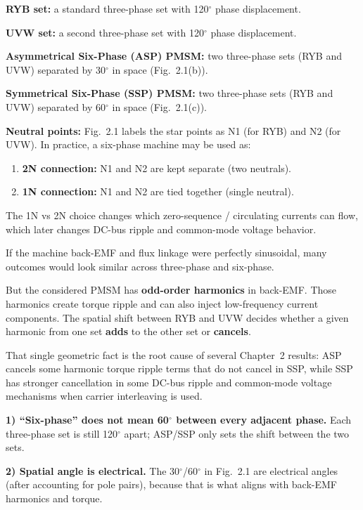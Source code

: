 \documentclass[12pt, a4paper]{article}
\begin{document}
\begin{statebox}
\textbf{RYB set:} a standard three-phase set with 120$^{\circ}$ phase displacement.

\textbf{UVW set:} a second three-phase set with 120$^{\circ}$ phase displacement.

\textbf{Asymmetrical Six-Phase (ASP) PMSM:} two three-phase sets (RYB and UVW)
separated by 30$^{\circ}$ in space (Fig.~2.1(b)).

\textbf{Symmetrical Six-Phase (SSP) PMSM:} two three-phase sets (RYB and UVW)
separated by 60$^{\circ}$ in space (Fig.~2.1(c)).

\textbf{Neutral points:} Fig.~2.1 labels the star points as N1 (for RYB) and N2
(for UVW). In practice, a six-phase machine may be used as:
\begin{enumerate}
    \item \textbf{2N connection:} N1 and N2 are kept separate (two neutrals).
    \item \textbf{1N connection:} N1 and N2 are tied together (single neutral).
\end{enumerate}
The 1N vs 2N choice changes which zero-sequence / circulating currents can flow,
which later changes DC-bus ripple and common-mode voltage behavior.
\end{statebox}

\begin{physbox}
If the machine back-EMF and flux linkage were perfectly sinusoidal, many outcomes
would look similar across three-phase and six-phase.

But the considered PMSM has \textbf{odd-order harmonics} in back-EMF.
Those harmonics create torque ripple and can also inject low-frequency current
components. The spatial shift between RYB and UVW decides whether a given harmonic
from one set \textbf{adds} to the other set or \textbf{cancels}.

That single geometric fact is the root cause of several Chapter~2 results:
ASP cancels some harmonic torque ripple terms that do not cancel in SSP, while SSP
has stronger cancellation in some DC-bus ripple and common-mode voltage mechanisms
when carrier interleaving is used.
\end{physbox}

\begin{warningbox}
\textbf{1) “Six-phase” does not mean 60$^{\circ}$ between every adjacent phase.}
Each three-phase set is still 120$^{\circ}$ apart; ASP/SSP only sets the shift
between the two sets.

\textbf{2) Spatial angle is electrical.}
The 30$^{\circ}$/60$^{\circ}$ in Fig.~2.1 are electrical angles (after accounting for
pole pairs), because that is what aligns with back-EMF harmonics and torque.
\end{warningbox}
\end{document}
